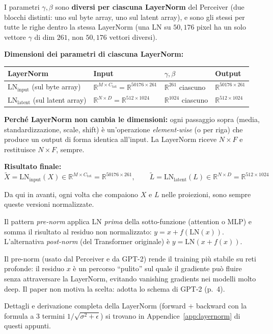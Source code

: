 \documentclass[
  11pt,
]{article}
\begin{document}
I parametri $\gamma, \beta$ sono \textbf{diversi per ciascuna LayerNorm} del Perceiver (due blocchi distinti: uno sul byte array, uno sul latent array), e sono gli stessi per tutte le righe dentro la stessa LayerNorm (una LN su $50{,}176$ pixel ha un solo vettore $\gamma$ di dim $261$, non $50{,}176$ vettori diversi).

\medskip
\textbf{Dimensioni dei parametri di ciascuna LayerNorm:}

\begin{center}
\begin{tabular}{@{}llll@{}}
\toprule
\textbf{LayerNorm} & \textbf{Input} & \textbf{$\gamma, \beta$} & \textbf{Output} \\
\midrule
$\mathrm{LN}_\text{input}$ (sul byte array) & $\mathbb{R}^{M \times C_{\text{tot}}} = \mathbb{R}^{50176 \times 261}$ & $\mathbb{R}^{261}$ ciascuno & $\mathbb{R}^{50176 \times 261}$ \\
$\mathrm{LN}_\text{latent}$ (sul latent array) & $\mathbb{R}^{N \times D} = \mathbb{R}^{512 \times 1024}$ & $\mathbb{R}^{1024}$ ciascuno & $\mathbb{R}^{512 \times 1024}$ \\
\bottomrule
\end{tabular}
\end{center}

\medskip
\textbf{Perché LayerNorm non cambia le dimensioni:} ogni passaggio sopra (media, standardizzazione, scale, shift) è un'operazione \emph{element-wise} (o per riga) che produce un output di forma identica all'input. La LayerNorm riceve $N \times F$ e restituisce $N \times F$, sempre.

\medskip
\textbf{Risultato finale:}
\[
\tilde{X} = \mathrm{LN}_\text{input}(X) \in \mathbb{R}^{M \times C_{\text{tot}}} = \mathbb{R}^{50176 \times 261}, \qquad \tilde{L} = \mathrm{LN}_\text{latent}(L) \in \mathbb{R}^{N \times D} = \mathbb{R}^{512 \times 1024}
\]

Da qui in avanti, ogni volta che compaiono $X$ e $L$ nelle proiezioni, sono sempre queste versioni normalizzate.

\begin{notabox}[title={\textbf{Perché LayerNorm \emph{prima} dell'attention (pre-norm)?}}]
Il pattern \emph{pre-norm} applica LN \emph{prima} della sotto-funzione (attention o MLP) e somma il risultato al residuo non normalizzato: $y = x + f(\mathrm{LN}(x))$. L'alternativa \emph{post-norm} (del Transformer originale) è $y = \mathrm{LN}(x + f(x))$.

Il pre-norm (usato dal Perceiver e da GPT-2) rende il training più stabile su reti profonde: il residuo $x$ è un percorso ``pulito'' sul quale il gradiente può fluire senza attraversare la LayerNorm, evitando vanishing gradients nei modelli molto deep. Il paper non motiva la scelta: adotta lo schema di GPT-2 (p.~4).

Dettagli e derivazione completa della LayerNorm (forward $+$ backward con la formula a 3 termini $1/\sqrt{\sigma^2 + \epsilon}$) si trovano in Appendice~\ref{app:layernorm} di questi appunti.
\end{notabox}
\end{document}
